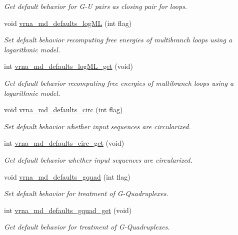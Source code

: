 \begin{DoxyCompactItemize}
\begin{DoxyCompactList}\small\item\em Get default behavior for G-\/U pairs as closing pair for loops. \end{DoxyCompactList}\item 
void \hyperlink{group__model__details_ga3de50a73455d88c3957386933b8e1f90}{vrna\+\_\+md\+\_\+defaults\+\_\+log\+ML} (int flag)
\begin{DoxyCompactList}\small\item\em Set default behavior recomputing free energies of multibranch loops using a logarithmic model. \end{DoxyCompactList}\item 
int \hyperlink{group__model__details_ga93f04e070d529c5d0bb87c9681f6ad29}{vrna\+\_\+md\+\_\+defaults\+\_\+log\+M\+L\+\_\+get} (void)
\begin{DoxyCompactList}\small\item\em Get default behavior recomputing free energies of multibranch loops using a logarithmic model. \end{DoxyCompactList}\item 
void \hyperlink{group__model__details_ga4e1deb3e91a8a99e5c6dd905a5eb0186}{vrna\+\_\+md\+\_\+defaults\+\_\+circ} (int flag)
\begin{DoxyCompactList}\small\item\em Set default behavior whether input sequences are circularized. \end{DoxyCompactList}\item 
int \hyperlink{group__model__details_gad3a7e58de344ad93a08925f58f94f6fb}{vrna\+\_\+md\+\_\+defaults\+\_\+circ\+\_\+get} (void)
\begin{DoxyCompactList}\small\item\em Get default behavior whether input sequences are circularized. \end{DoxyCompactList}\item 
void \hyperlink{group__model__details_ga0685ca2aeb39af76f2421fc308163dce}{vrna\+\_\+md\+\_\+defaults\+\_\+gquad} (int flag)
\begin{DoxyCompactList}\small\item\em Set default behavior for treatment of G-\/\+Quadruplexes. \end{DoxyCompactList}\item 
int \hyperlink{group__model__details_gae645b8612f879eb38b45244fa9eddb9e}{vrna\+\_\+md\+\_\+defaults\+\_\+gquad\+\_\+get} (void)
\begin{DoxyCompactList}\small\item\em Get default behavior for treatment of G-\/\+Quadruplexes. \end{DoxyCompactList}\item 

\end{DoxyCompactItemize}
